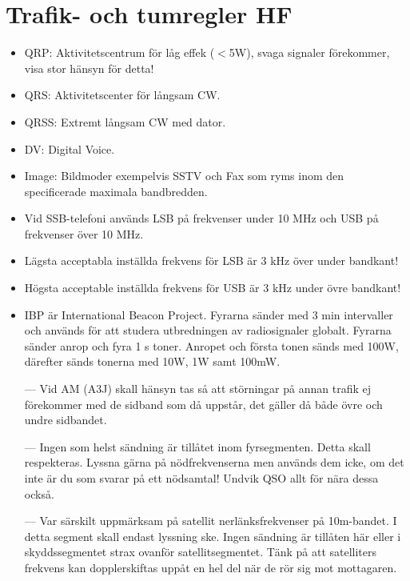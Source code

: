 \clearpage

\section{Trafik- och tumregler HF}

\begin{itemize}
\item QRP: Aktivitetscentrum för låg effek ($<$5W), svaga signaler förekommer, visa stor hänsyn för detta!
\item QRS: Aktivitetscenter för långsam CW.
\item QRSS: Extremt långsam CW med dator.
\item DV: Digital Voice.
\item Image: Bildmoder exempelvis SSTV och Fax som ryms inom den specificerade maximala bandbredden.
\item Vid SSB-telefoni används LSB på frekvenser under 10 MHz och USB på frekvenser över 10 MHz.
\item Lägsta acceptabla inställda frekvens för LSB är 3 kHz över under bandkant! 
\item Högsta acceptable inställda frekvens för USB är 3 kHz under övre bandkant!
\item IBP är International Beacon Project. Fyrarna sänder med 3 min intervaller och används för att studera utbredningen av radiosignaler globalt. Fyrarna sänder anrop och fyra 1 s toner. Anropet och första tonen sänds med 100W, därefter sänds tonerna med 10W, 1W samt 100mW.
\end{itemize}

\begin{itemize}
\item[---] Vid AM (A3J) skall hänsyn tas så att störningar på annan trafik ej fö\-re\-kom\-mer med de sidband som då uppstår, det gäller då både övre och undre sidbandet.
\item[---] Ingen som helst sändning är tillåtet inom fyrsegmenten. Detta skall respekteras. Lyssna gärna på nödfrekvenserna men används dem icke, om det inte är du som svarar på ett nödsamtal! Undvik QSO allt för nära dessa också.
\item[---] Var särskilt uppmärksam på satellit nerlänksfrekvenser på 10m-bandet. I detta segment skall endast lyssning ske. Ingen sändning är tillåten här eller i skyddssegmentet strax ovanför satellitsegmentet. Tänk på att satelliters frekvens kan dopplerskiftas uppåt en hel del när de rör sig mot mottagaren.
\end{itemize}

